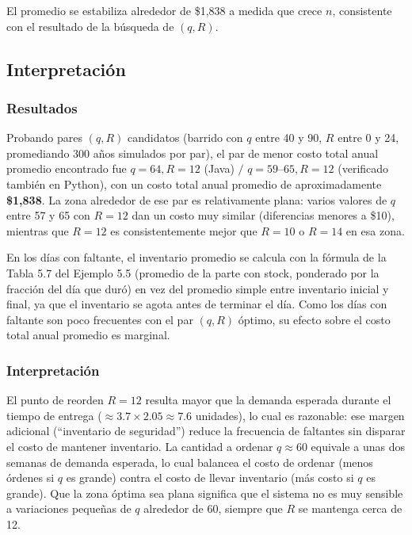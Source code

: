 El promedio se estabiliza alrededor de \$1,838 a medida que crece $n$, consistente con el resultado de la búsqueda de $(q,R)$.

\subsection{Interpretación}

\subsubsection{Resultados}

Probando pares $(q,R)$ candidatos (barrido con $q$ entre 40 y 90, $R$ entre 0 y 24, promediando 300 años simulados por par), el par de menor costo total anual promedio encontrado fue $q=64, R=12$ (Java) $/$ $q=59\text{--}65, R=12$ (verificado también en Python), con un costo total anual promedio de aproximadamente \textbf{\$1,838}. La zona alrededor de ese par es relativamente plana: varios valores de $q$ entre 57 y 65 con $R=12$ dan un costo muy similar (diferencias menores a \$10), mientras que $R=12$ es consistentemente mejor que $R=10$ o $R=14$ en esa zona.

En los días con faltante, el inventario promedio se calcula con la fórmula de la Tabla 5.7 del Ejemplo 5.5 (promedio de la parte con stock, ponderado por la fracción del día que duró) en vez del promedio simple entre inventario inicial y final, ya que el inventario se agota antes de terminar el día. Como los días con faltante son poco frecuentes con el par $(q,R)$ óptimo, su efecto sobre el costo total anual promedio es marginal.

\subsubsection{Interpretación}

El punto de reorden $R=12$ resulta mayor que la demanda esperada durante el tiempo de entrega ($\approx 3.7 \times 2.05 \approx 7.6$ unidades), lo cual es razonable: ese margen adicional (``inventario de seguridad'') reduce la frecuencia de faltantes sin disparar el costo de mantener inventario. La cantidad a ordenar $q \approx 60$ equivale a unas dos semanas de demanda esperada, lo cual balancea el costo de ordenar (menos órdenes si $q$ es grande) contra el costo de llevar inventario (más costo si $q$ es grande). Que la zona óptima sea plana significa que el sistema no es muy sensible a variaciones pequeñas de $q$ alrededor de 60, siempre que $R$ se mantenga cerca de 12.

